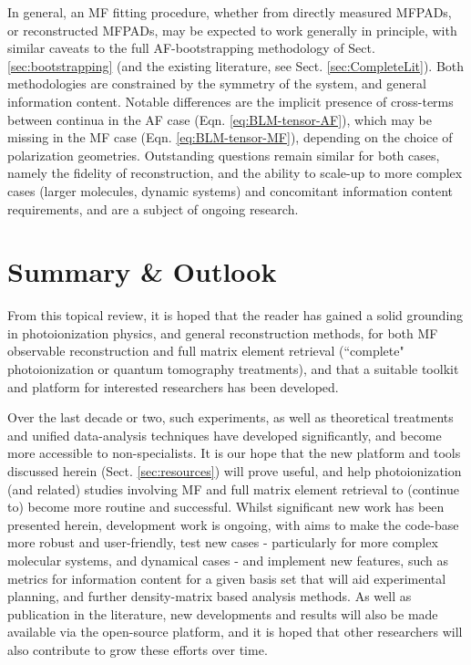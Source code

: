 \documentclass[10pt]{article}
\begin{document}
In general, an MF fitting procedure, whether from directly measured MFPADs, or reconstructed MFPADs, may be expected to work generally in principle, with similar caveats to the full AF-bootstrapping methodology of Sect. \ref{sec:bootstrapping} (and the existing literature, see Sect. \ref{sec:CompleteLit}). Both methodologies are constrained by the symmetry of the system, and general information content. Notable differences are the implicit presence of cross-terms between continua in the AF case (Eqn. \ref{eq:BLM-tensor-AF}), which may be missing in the MF case (Eqn. \ref{eq:BLM-tensor-MF}), depending on the choice of polarization geometries.
Outstanding questions remain similar for both cases, namely the fidelity of reconstruction, and the ability to scale-up to more complex cases (larger molecules, dynamic systems) and concomitant information content requirements, and are a subject of ongoing research.







\section{Summary \& Outlook \label{sec:summary-outlook}}

From this topical review, it is hoped that the reader has gained a solid grounding in photoionization physics, and general reconstruction methods, for both MF observable reconstruction and full matrix element retrieval (``complete" photoionization or quantum tomography treatments), and that a suitable toolkit and platform for interested researchers has been developed. 

Over the last decade or two, such experiments, as well as theoretical treatments and unified data-analysis techniques have developed significantly, and become more accessible to non-specialists. It is our hope 
that the new platform and tools discussed herein (Sect. \ref{sec:resources}) will prove useful, and help photoionization (and related) studies involving MF and full matrix element retrieval to (continue to) become more routine and successful. Whilst significant new work has been presented herein, development work is ongoing, with aims to make the code-base more robust and user-friendly, test new cases - particularly for more complex molecular systems, and dynamical cases - and implement new features, such as metrics for information content for a given basis set that will aid experimental planning, and further density-matrix based analysis methods. As well as publication in the literature, new developments and results will also be made available via the open-source platform, and it is hoped that other researchers will also contribute to grow these efforts over time.
\end{document}
